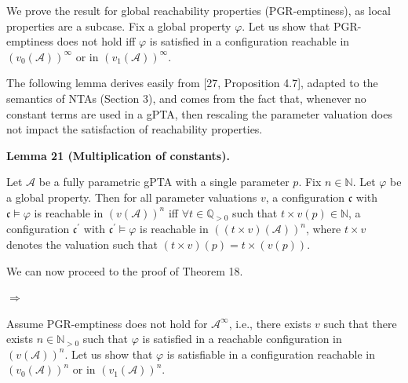 \documentclass[10pt,a4paper]{article}
\begin{document}
 
We prove the result for global reachability properties (PGR-emptiness), as local properties are a subcase. Fix a global property $\varphi$. Let us show that PGR-emptiness does not hold iff $\varphi$ is satisfied in a configuration reachable in ${(v_{0}(\mathcal{A}))}^{\infty}$ or in ${(v_{1}(\mathcal{A}))}^{\infty}$.\par
 
 
 
The following lemma derives easily from [27, Proposition 4.7], adapted to the semantics of NTAs (Section 3), and comes from the fact that, whenever no constant terms are used in a gPTA, then rescaling the parameter valuation does not impact the satisfaction of reachability properties.\par
 
 
 
\par\medskip\noindent\textbf{Lemma 21 (Multiplication of constants).}\par
 
 
Let $\mathcal{A}$ be a fully parametric gPTA with a single parameter $p$. Fix $n\in\mathbb{N}$. Let $\varphi$ be a global property. Then for all parameter valuations $v$, a configuration $\mathfrak{c}$ with $\mathfrak{c}\models\varphi$ is reachable in ${(v(\mathcal{A}))}^{n}$ iff $\forall t\in\mathbb{Q}_{>0}$ such that $t\times v(p)\in\mathbb{N}$, a configuration $\mathfrak{c}^{\prime}$ with $\mathfrak{c}^{\prime}\models\varphi$ is reachable in ${((t\times v)(\mathcal{A}))}^{n}$, where $t\times v$ denotes the valuation such that $(t\times v)(p)=t\times(v(p))$.\par
 
 
 
 
We can now proceed to the proof of Theorem 18.\par
 
 
  $\Rightarrow$  
 
Assume PGR-emptiness does not hold for ${\mathcal{A}}^{\infty}$, i.e., there exists $v$ such that there exists $n\in\mathbb{N}_{>0}$ such that $\varphi$ is satisfied in a reachable configuration in ${(v(\mathcal{A}))}^{n}$. Let us show that $\varphi$ is satisfiable in a configuration reachable in ${(v_{0}(\mathcal{A}))}^{n}$ or in ${(v_{1}(\mathcal{A}))}^{n}$.\par
 
\end{document}
